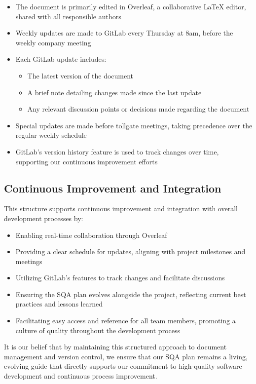 \documentclass{article}
\begin{document}
\begin{itemize}
    \item The document is primarily edited in Overleaf, a collaborative LaTeX editor, shared with all responsible authors
    \item Weekly updates are made to GitLab every Thursday at 8am, before the weekly company meeting
    \item Each GitLab update includes:
    \begin{itemize}
        \item The latest version of the document
        \item A brief note detailing changes made since the last update
        \item Any relevant discussion points or decisions made regarding the document
    \end{itemize}
    \item Special updates are made before tollgate meetings, taking precedence over the regular weekly schedule
    \item GitLab's version history feature is used to track changes over time, supporting our continuous improvement efforts
\end{itemize}

\subsection{Continuous Improvement and Integration}
This structure supports continuous improvement and integration with overall development processes by:

\begin{itemize}
    \item Enabling real-time collaboration through Overleaf
    \item Providing a clear schedule for updates, aligning with project milestones and meetings
    \item Utilizing GitLab's features to track changes and facilitate discussions
    \item Ensuring the SQA plan evolves alongside the project, reflecting current best practices and lessons learned
    \item Facilitating easy access and reference for all team members, promoting a culture of quality throughout the development process
\end{itemize}

It is our belief that by maintaining this structured approach to document management and version control, we ensure that our SQA plan remains a living, evolving guide that directly supports our commitment to high-quality software development and continuous process improvement.
\end{document}
